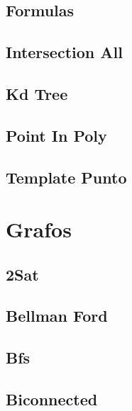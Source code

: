 \documentclass[10pt,landscape,twocolumn,a4paper,notitlepage]{article}
\newcommand\cppfile[2][]{

}
\begin{document}
\subsection{Formulas}
\cppfile{geometry/formulas.cpp}

\subsection{Intersection All}
\cppfile{geometry/intersection_all.cpp}

\subsection{Kd Tree}
\cppfile{geometry/kd_tree.cpp}

\subsection{Point In Poly}
\cppfile{geometry/point_in_poly.cpp}

\subsection{Template Punto}
\cppfile{geometry/template_punto.cpp}

\newpage


\section{Grafos}

\subsection{2Sat}
\cppfile{grafos/2SAT.cpp}

\subsection{Bellman Ford}
\cppfile{grafos/bellman_ford.cpp}

\subsection{Bfs}
\cppfile{grafos/BFS.cpp}

\subsection{Biconnected}
\cppfile{grafos/biconnected.cpp}
\end{document}
